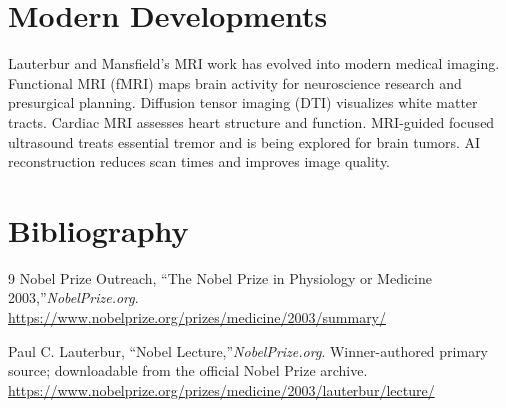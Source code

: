 \section{Modern Developments}

Lauterbur and Mansfield's MRI work has evolved into modern medical imaging. Functional MRI (fMRI) maps brain activity for neuroscience research and presurgical planning. Diffusion tensor imaging (DTI) visualizes white matter tracts. Cardiac MRI assesses heart structure and function. MRI-guided focused ultrasound treats essential tremor and is being explored for brain tumors. AI reconstruction reduces scan times and improves image quality.


\section{Bibliography}

\begin{thebibliography}{9}
Nobel Prize Outreach, ``The Nobel Prize in Physiology or Medicine 2003,''\emph{NobelPrize.org}.\\
\url{https://www.nobelprize.org/prizes/medicine/2003/summary/}

Paul C. Lauterbur, ``Nobel Lecture,''\emph{NobelPrize.org}. Winner-authored primary source; downloadable from the official Nobel Prize archive.\\
\url{https://www.nobelprize.org/prizes/medicine/2003/lauterbur/lecture/}
\end{thebibliography}
